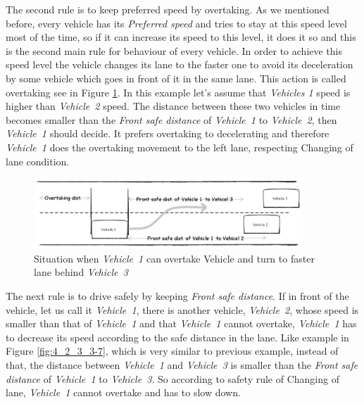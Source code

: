 The second rule is to keep preferred speed by overtaking.  As we mentioned before, every vehicle has its \textit{Preferred speed} and tries to stay at this speed level most of the time, so if it can increase its speed to this level, it does it so and this is the second main rule for behaviour of every vehicle. In order to achieve this speed level the vehicle changes its lane to the faster one to avoid its deceleration by some vehicle which goes in front of it in the same lane. This action is called overtaking see in Figure \ref{fig:4_2_3_3-6}. In this example let’s assume that \textit{Vehicles 1}  speed is higher than \textit{\mbox{Vehicle 2}} speed. The distance between these two vehicles in time becomes smaller than the \textit{Front safe distance} of \textit{\mbox{Vehicle 1}} to \textit{\mbox{Vehicle 2}},  then \textit{\mbox{Vehicle 1}} should decide. It prefers overtaking to decelerating and therefore \textit{\mbox{Vehicle 1}} does the overtaking movement to the left lane, respecting Changing of lane condition.

\begin{figure}[ph]
\centering
\includegraphics[width=0.90\textwidth,height=0.90\textheight,keepaspectratio]{figures/Chapter_4/4_can_overtake.png}
\centering
\protect\caption{\label{fig:4_2_3_3-6}Situation when \textit{\mbox{Vehicle 1}} can overtake Vehicle and turn to faster lane behind \textit{\mbox{Vehicle 3}}}
\end{figure}

The next rule is to drive safely by keeping \textit{Front safe distance}. If in front of the vehicle, let us call it \textit{\mbox{Vehicle 1}}, there is another vehicle, \textit{\mbox{Vehicle 2}}, whose speed is smaller than that of \textit{\mbox{Vehicle 1}} and that \textit{\mbox{Vehicle 1}} cannot overtake, \textit{\mbox{Vehicle 1}} has to decrease its speed according to the safe distance in the lane. Like example in Figure \ref{fig:4_2_3_3-7}, which is very similar to previous example, instead of that, the distance between \textit{\mbox{Vehicle 1}} and \textit{\mbox{Vehicle 3}} is smaller than the \textit{Front safe distance} of \textit{\mbox{Vehicle 1}} to \textit{\mbox{Vehicle 3}}. So according to safety rule of Changing of lane, \textit{\mbox{Vehicle 1}} cannot overtake and has to slow down.

